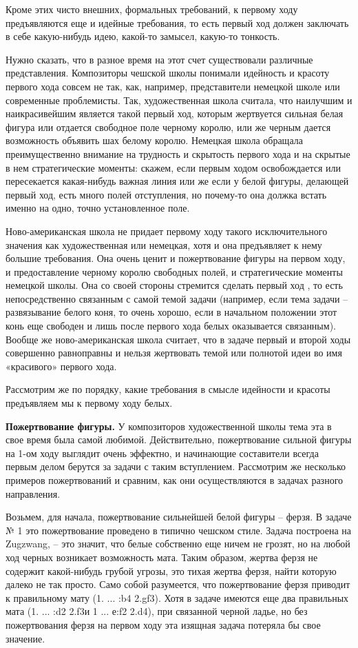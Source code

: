 Кроме этих чисто внешних, формальных требований, к первому ходу предъявляются еще и идейные требования, то есть первый ход должен заключать в себе какую-нибудь идею, какой-то замысел, какую-то тонкость.

Нужно сказать, что в разное время на этот счет существовали различные представления. Композиторы чешской школы понимали идейность и красоту первого хода совсем не так, как, например, представители немецкой школе или современные проблемисты. Так, художественная школа считала, что наилучшим и наикрасивейшим является такой первый ход, которым жертвуется сильная белая фигура или отдается свободное поле черному королю, или же черным дается возможность объявить шах белому королю. Немецкая школа обращала преимущественно внимание на трудность и скрытость первого хода и на скрытые в нем стратегические моменты: скажем, если первым ходом освобождается или пересекается какая-нибудь важная линия или же если у белой фигуры, делающей первый ход, есть много полей отступления, но почему-то она должка встать именно на одно, точно установленное поле.

Ново-американская школа не придает первому ходу такого исключительного значения как художественная или немецкая, хотя и она предъявляет к нему большие требования. Она очень ценит и пожертвование фигуры на первом ходу, и предоставление черному королю свободных полей, и стратегические моменты немецкой школы. Она со своей стороны стремится сделать первый ход , то есть непосредственно связанным с самой темой задачи (например, если тема задачи -- развязывание белого коня, то очень хорошо, если в начальном положении этот конь еще свободен и лишь после первого хода белых оказывается связанным). Вообще же ново-американская школа считает, что в задаче первый и второй ходы совершенно равноправны и нельзя жертвовать темой или полнотой идеи во имя «красивого» первого хода.

Рассмотрим же по порядку, какие требования в смысле идейности и красоты предъявляем мы к первому ходу белых.

\textbf{Пожертвование фигуры.} У композиторов художественной школы тема эта в свое время была самой любимой. Действительно, пожертвование сильной фигуры на 1-ом ходу выглядит очень эффектно, и начинающие составители всегда первым делом берутся за задачи с таким вступлением. Рассмотрим же несколько примеров пожертвований и сравним, как они осуществляются в задачах разного направления.

Возьмем, для начала, пожертвование сильнейшей белой фигуры -- ферзя. В задаче № 1 это пожертвование проведено в типично чешском стиле. Задача построена на Zugzwang, -- это значит, что белые собственно еще ничем не грозят, но на любой ход черных возникает возможность мата. Таким образом, жертва ферзя не содержит какой-нибудь грубой угрозы, это тихая жертва ферзя, найти которую далеко не так просто. Само собой разумеется, что пожертвование ферзя приводит к правильному мату (1. ... \rook{}:b4 2.\knight{}gf3\mate). Хотя в задаче имеются еще два правильных мата (1. ... \rook{}:d2 2.f3\mate и 1 ... \rook{}е:f2 2.d4\mate), при связанной черной ладье, но без пожертвования ферзя на первом ходу эта изящная задача потеряла бы свое значение.

